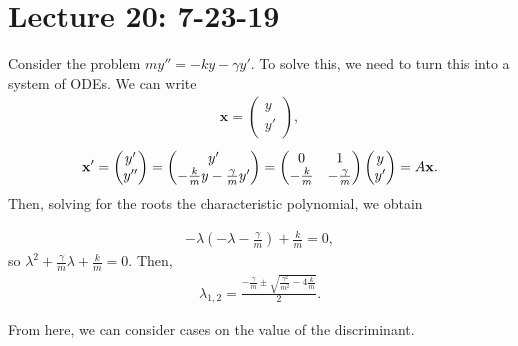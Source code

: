 \documentclass{article}
\newcommand{\mat}[1]{\begin{pmatrix}#1\end{pmatrix}}
\begin{document}
\section{Lecture 20: 7-23-19}

Consider the problem $my'' = -ky - \gamma y'$.    To solve this, we need to turn this into a system of ODEs.  We can write
\begin{align*}
  \mathbf{x} = \mat{y \\ y'},
\end{align*}
\begin{align*}
  \mbf{x}' = \mat{y' \\ y''} = \mat{y' \\ - \frac{k}{m} y - \frac{\gamma}{m} y'} = \mat{0 & 1 \\ - \frac{k}{m} & - \frac{\gamma}{m}} \mat{y \\ y'} = A \bf{x}.
\end{align*}
Then, solving for the roots the characteristic polynomial, we obtain

\begin{align*}
  - \lambda \left( - \lambda - \frac{\gamma}{m} \right) + \frac{k}{m} = 0,
\end{align*}
so $\lambda^2 + \frac{\gamma}{m} \lambda + \frac{k}{m} = 0$.  Then,
\begin{align*}
  \lambda_{1, 2} = \frac{- \frac{\gamma}{m} \pm \sqrt{\frac{\gamma^2}{m^2} - 4 \frac{k}{m}}}{2}.
\end{align*}

From here, we can consider cases on the value of the discriminant.
\end{document}
